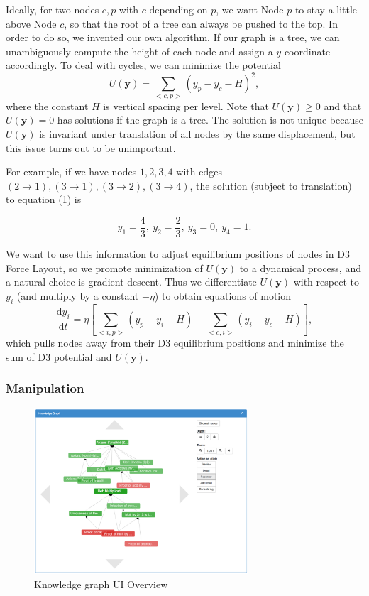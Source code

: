 \documentclass{acm_proc_article-sp}
\begin{document}
Ideally, for two nodes $c, p$ with $c$ depending on $p$, we want Node $p$ to stay a little above Node $c$, so that the root of a tree can always be pushed to the top.
In order to do so, we invented our own algorithm.
If our graph is a tree, we can unambiguously compute the height of each node and assign a $y$-coordinate accordingly. 
To deal with cycles, 
we can minimize the potential
\begin{equation}
U(\mathbf{y}) = \sum_{<c,p>}\left(y_p-y_c-H\right)^2,
\end{equation}
where the constant $H$ is vertical spacing per level.
Note that $U(\mathbf{y})\geq0$ and that $U(\mathbf{y})=0$ has solutions if the graph is a tree. 
The solution is not unique because $U(\mathbf{y})$ is invariant under translation of all nodes by the same displacement, 
but this issue turns out to be unimportant.

For example, if we have nodes $1,2,3,4$ with edges 
$(2 \rightarrow 1), (3 \rightarrow 1), (3 \rightarrow 2), (3 \rightarrow 4)$,
the solution (subject to translation) to equation (1)  is

$$y_1=\frac43,~y_2=\frac23,~y_3=0,~y_4=1.$$

We want to use this information to adjust equilibrium positions of nodes in D3 Force Layout,
so we promote minimization of $U(\mathbf{y})$ to a dynamical process,
and a natural choice is gradient descent.
Thus we differentiate $U(\mathbf{y})$ with respect to $y_i$ (and multiply by a constant $-\eta$) to obtain equations of motion 
\begin{equation}
\frac{\mathrm{d}y_i}{\mathrm{d}t} = \eta
\left[
\sum_{<i,p>}\left(y_p-y_i-H\right)
-\sum_{<c,i>}\left(y_i-y_c-H\right)\right],
\end{equation}
which pulls nodes away from their D3 equilibrium positions and minimize the sum of D3 potential and $U(\mathbf{y})$.

\subsubsection{Manipulation}
\begin{figure}[h!]
\centering
\includegraphics[width=8cm]{toolbar1.png}
\caption{Knowledge graph UI Overview}
\end{figure}
\end{document}
